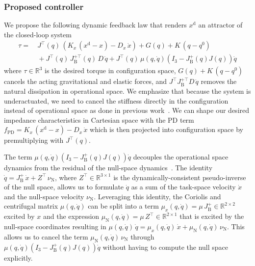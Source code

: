 \subsubsection{Proposed controller}
We propose the following dynamic feedback law that renders $x^\mathrm{d}$ an attractor of the closed-loop system %
\begin{equation}\label{eq:hsacontrol:task_space_impedance_control:cartesian_impedance_controller}
\begin{split}
    \tau =& \: J^\top(q) \, \left (K_x \, (x^\mathrm{d} - x) - D_x \, \dot{x} \right ) + G(q) + K \, (q-q^0)\\
    & \: + J^\top(q) \, J_\mathrm{B}^{+\top}(q) \, D \, \dot{q} + J^\top(q) \, \mu(q,\dot{q}) \left ( I_3 - J_\mathrm{B}^+(q) J(q) \right )\dot{q}
\end{split}
\end{equation}
where $\tau \in \mathbb{R}^3$ is the desired torque in configuration space, $G(q) + K \, (q-q^0)$ cancels the acting gravitational and elastic forces, and $J^\top J_\mathrm{B}^{+\top} D \, \dot{q}$ removes the natural dissipation in operational space.
We emphasize that because the system is underactuated, we need to cancel the stiffness directly in the configuration instead of operational space as done in previous work~\citep{della2020model}.
We can shape our desired impedance characteristics in Cartesian space with the PD term $f_\mathrm{PD} = K_x \, (x^\mathrm{d} - x) - D_x \, \dot{x} $ which is then projected into configuration space by premultiplying with $J^\top(q)$.

The term $\mu(q,\dot{q}) \left ( I_3 - J_\mathrm{B}^+(q) J(q) \right )\dot{q}$ decouples the operational space dynamics from the residual of the null-space dynamics~\citep{della2020model}\cite[Ch. 4]{ott2008cartesian}.
The identity $\dot{q} = J_\mathrm{B}^+ \, \dot{x} + Z^\top \, \nu_\mathrm{N}$, where $Z^\top \in \mathbb{R}^{3 \times 1}$ is the dynamically-consistent pseudo-inverse of the null space, allows us to formulate $\dot{q}$ as a sum of the task-space velocity $\dot{x}$ and the null-space velocity $\nu_\mathrm{N}$. Leveraging this identity, the Coriolis and centrifugal matrix $\mu(q,\dot{q})$ can be split into a term $\mu_x(q,\dot{q}) = \mu \, J_\mathrm{B}^+ \in \mathbb{R}^{2 \times 2}$ excited by $x$ and the expression $\mu_\mathrm{N}(q,\dot{q}) = \mu \, Z^\top \in \mathbb{R}^{2 \times 1}$ that is excited by the null-space coordinates resulting in $\mu(q,\dot{q}) \, \dot{q} = \mu_x(q,\dot{q}) \, \dot{x} + \mu_\mathrm{N}(q,\dot{q}) \, \nu_\mathrm{N}$.
This allows us to cancel the term $\mu_\mathrm{N}(q,\dot{q}) \, \nu_\mathrm{N}$ through $\mu(q,\dot{q}) \left ( I_3 - J_\mathrm{B}^+(q) J(q) \right )\dot{q}$ without having to compute the null space explicitly.


